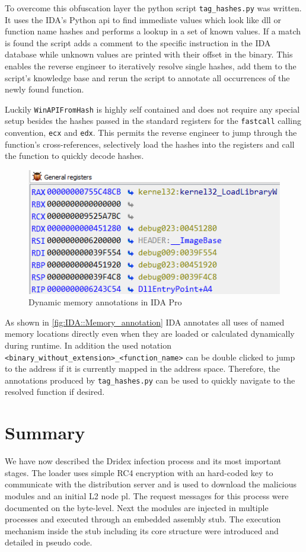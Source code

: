To overcome this obfuscation layer the python script \lstinline|tag_hashes.py| was written. 
It uses the IDA's Python \gls{api} to find immediate values which look like \gls{dll} or function name hashes and performs a lookup in a set of known values.
If a match is found the script adds a comment to the specific instruction in the IDA database while unknown values are printed with their offset in the binary.
This enables the reverse engineer to iteratively resolve single hashes, add them to the script's knowledge base and rerun the script to annotate all occurrences of the newly found function.

Luckily \lstinline|WinAPIFromHash| is highly self contained and does not require any special setup besides the hashes passed in the standard registers for the \lstinline|fastcall| calling convention, \lstinline|ecx| and \lstinline|edx|.
This permits the reverse engineer to jump through the function's cross-references, selectively load the hashes into the registers and call the function to quickly decode hashes.

\begin{figure}
    \centering
    \includegraphics[width=.75\textwidth]{img/memory_annotation_dynamic}
    \caption{Dynamic memory annotations in IDA Pro\label{fig:IDA::Memory_annotation}}
\end{figure}

As shown in \autoref{fig:IDA::Memory_annotation} IDA annotates all uses of named memory locations directly even when they are loaded or calculated dynamically during runtime.
In addition the used notation \lstinline|<binary_without_extension>_<function_name>| can be double clicked to jump to the address if it is currently mapped in the address space.
Therefore, the annotations produced by \lstinline|tag_hashes.py| can be used to quickly navigate to the resolved function if desired.


\section{Summary\label{sec:Reverse_engineering_Dridex::Summary}}
We have now described the Dridex infection process and its most important stages.
The loader uses simple RC4 encryption with an hard-coded key to communicate with the distribution server and is used to download the malicious modules and an initial L2 node \gls{pl}.
The request messages for this process were documented on the byte-level.
Next the modules are injected in multiple processes and executed through an embedded assembly stub.
The execution mechanism inside the stub including its core structure were introduced and detailed in pseudo code.

